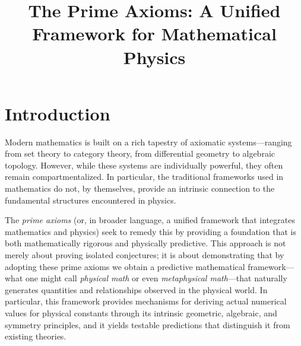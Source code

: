 \documentclass[12pt]{article}
\begin{document}
\title{The Prime Axioms: A Unified Framework for Mathematical Physics}
\author{ }
\date{}
\maketitle

\section*{Introduction}
Modern mathematics is built on a rich tapestry of axiomatic systems---ranging from set theory to category theory, from differential geometry to algebraic topology. However, while these systems are individually powerful, they often remain compartmentalized. In particular, the traditional frameworks used in mathematics do not, by themselves, provide an intrinsic connection to the fundamental structures encountered in physics.

The \emph{prime axioms} (or, in broader language, a unified framework that integrates mathematics and physics) seek to remedy this by providing a foundation that is both mathematically rigorous and physically predictive. This approach is not merely about proving isolated conjectures; it is about demonstrating that by adopting these prime axioms we obtain a predictive mathematical framework---what one might call \emph{physical math} or even \emph{metaphysical math}---that naturally generates quantities and relationships observed in the physical world. In particular, this framework provides mechanisms for deriving actual numerical values for physical constants through its intrinsic geometric, algebraic, and symmetry principles, and it yields testable predictions that distinguish it from existing theories.
\end{document}
